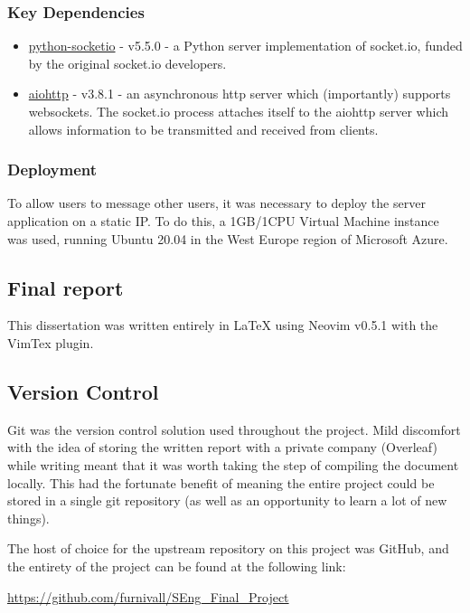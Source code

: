 \documentclass{mproj}
\begin{document}
\subsubsection{Key Dependencies}
\begin{itemize}
	\item \href{https://python-socketio.readthedocs.io/en/latest/index.html}{python-socketio} - v5.5.0 - a Python server implementation of socket.io, funded by the original socket.io developers.
	\item \href{https://docs.aiohttp.org/en/stable/}{aiohttp} - v3.8.1 - an asynchronous http server which (importantly) supports websockets. The socket.io process attaches itself to the aiohttp server which allows information to be transmitted and received from clients.
\end{itemize}

\subsubsection{Deployment}
To allow users to message other users, it was necessary to deploy the server application on a static IP. To do this, a 1GB/1CPU Virtual Machine instance was used, running Ubuntu 20.04 in the West Europe region of Microsoft Azure. 

\subsection{Final report}
This dissertation was written entirely in LaTeX using Neovim v0.5.1 with the VimTex plugin. 

\subsection{Version Control}
Git was the version control solution used throughout the project. Mild discomfort with the idea of storing the written report with a private company (Overleaf) while writing meant that it was worth taking the step of compiling the document locally. This had the fortunate benefit of meaning the entire project could be stored in a single git repository (as well as an opportunity to learn a lot of new things). 

The host of choice for the upstream repository on this project was GitHub, and the entirety of the project can be found at the following link: 

\begin{center}
\href{https://github.com/furnivall/SEng_Final_Project}{https://github.com/furnivall/SEng\_Final\_Project}
\end{center}
\end{document}
